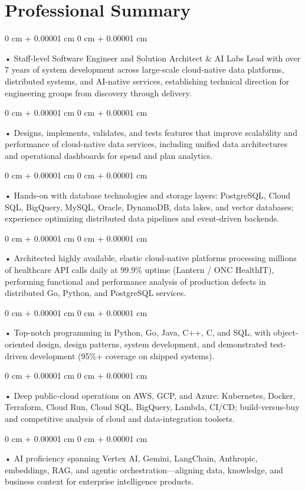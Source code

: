 \documentclass[10pt, letterpaper]{article}
\newenvironment{onecolentry}{
    \begin{adjustwidth}{
        0 cm + 0.00001 cm
    }{
        0 cm + 0.00001 cm
    }
}{
    \end{adjustwidth}
} %
\begin{document}
    \section{Professional Summary}
        \vspace{2 pt }
        \begin{onecolentry}
            • Staff-level Software Engineer and Solution Architect \& AI Labs Lead with over 7 years of system development across large-scale cloud-native data platforms, distributed systems, and AI-native services, establishing technical direction for engineering groups from discovery through delivery.
        \end{onecolentry}
        \begin{onecolentry}
            • Designs, implements, validates, and tests features that improve scalability and performance of cloud-native data services, including unified data architectures and operational dashboards for spend and plan analytics.
        \end{onecolentry}
        \begin{onecolentry}
            • Hands-on with database technologies and storage layers: PostgreSQL, Cloud SQL, BigQuery, MySQL, Oracle, DynamoDB, data lakes, and vector databases; experience optimizing distributed data pipelines and event-driven backends.
        \end{onecolentry}
        \begin{onecolentry}
            • Architected highly available, elastic cloud-native platforms processing millions of healthcare API calls daily at 99.9\% uptime (Lantern / ONC HealthIT), performing functional and performance analysis of production defects in distributed Go, Python, and PostgreSQL services.
        \end{onecolentry}
        \begin{onecolentry}
            • Top-notch programming in Python, Go, Java, C++, C, and SQL, with object-oriented design, design patterns, system development, and demonstrated test-driven development (95\%+ coverage on shipped systems).
        \end{onecolentry}
        \begin{onecolentry}
            • Deep public-cloud operations on AWS, GCP, and Azure: Kubernetes, Docker, Terraform, Cloud Run, Cloud SQL, BigQuery, Lambda, CI/CD; build-versus-buy and competitive analysis of cloud and data-integration toolsets.
        \end{onecolentry}
        \begin{onecolentry}
            • AI proficiency spanning Vertex AI, Gemini, LangChain, Anthropic, embeddings, RAG, and agentic orchestration---aligning data, knowledge, and business context for enterprise intelligence products.
        \end{onecolentry}
\end{document}
